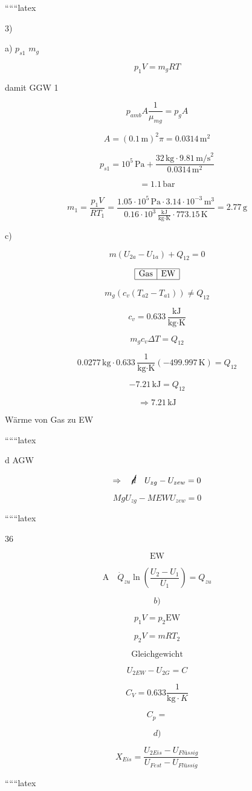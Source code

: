 
``````latex


3) 

a) $p_{s1}$ \hspace{1cm} $m_g$

\[ p_1 V = m_g RT \]

damit \hspace{0.5cm} GGW \hspace{0.5cm} 1

\[ p_{amb} A \frac{1}{\mu_{mg}} = p_g A \]

\[ A = (0.1 \, \text{m})^2 \pi = 0.0314 \, \text{m}^2 \]

\[ p_{s1} = 10^5 \, \text{Pa} + \frac{32 \, \text{kg} \cdot 9.81 \, \text{m/s}^2}{0.0314 \, \text{m}^2} \]

\[ = 1.1 \, \text{bar} \]

\[ m_1 = \frac{p_1 V}{RT_1} = \frac{1.05 \cdot 10^5 \, \text{Pa} \cdot 3.14 \cdot 10^{-3} \, \text{m}^3}{0.16 \cdot 10^3 \, \frac{\text{kJ}}{\text{kg} \cdot \text{K}} \cdot 773.15 \, \text{K}} = 2.77 \, \text{g} \]

c) 

\[ m (U_{2a} - U_{1a}) + Q_{12} = 0 \]

\[
\begin{array}{|c|c|}
\hline
\text{Gas} & \text{EW} \\
\hline
\end{array}
\]

\[ m_g (c_v (T_{a2} - T_{a1})) \neq Q_{12} \]

\[ c_v = 0.633 \, \frac{\text{kJ}}{\text{kg} \cdot \text{K}} \]

\[ m_g c_v \Delta T = Q_{12} \]

\[ 0.0277 \, \text{kg} \cdot 0.633 \, \frac{1}{\text{kg} \cdot \text{K}} \left( -499.997 \, \text{K} \right) = Q_{12} \]

\[ -7.21 \, \text{kJ} = Q_{12} \]

\[ \Rightarrow 7.21 \, \text{kJ} \]

Wärme von Gas zu EW

``````latex


d \quad {} \quad AGW

\[
\Rightarrow \quad \cancel{\cancel{d}} \quad U_{zg} - U_{zew} = 0
\]

\[
Mg U_{zg} - MEW U_{zew} = 0
\]

``````latex


36

\[
\text{EW}
\]

\[
\text{A} \quad \dot{Q}_{zu} \ln \left( \frac{U_2 - U_1}{U_1} \right) = Q_{zu}
\]

\[
b)
\]

\[
p_1 V = p_2 \text{EW}
\]

\[
p_2 V = m R T_2
\]

\[
\text{Gleichgewicht}
\]

\[
U_{2EW} - U_{2G} = C
\]

\[
C_V = 0.633 \frac{1}{\text{kg} \cdot K}
\]

\[
C_p =
\]

\[
d)
\]

\[
X_{Eis} = \frac{U_{2Eis} - U_{Flüssig}}{U_{Fest} - U_{Flüssig}}
\]

``````latex


